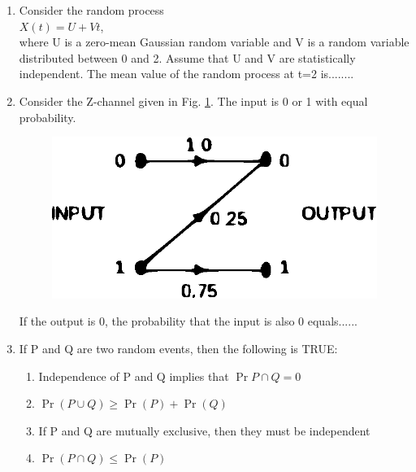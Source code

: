 \documentclass[journal,12pt,twocolumn]{IEEEtran}
\begin{document}
\begin{enumerate}
\begin{enumerate}
\end{enumerate}
%
\solution

\item Consider the random process\\
$ X(t) = U+Vt$,\\
where U is a zero-mean Gaussian random variable and V is a random variable distributed between 0 and 2. Assume that U and V are statistically independent. The mean value of the random  process at t=2 is........
%
\solution


\item Consider the Z-channel given in Fig. \ref{fig:1}. The input is 0 or 1 with equal probability.
\begin{figure}[!h]
\includegraphics[width=\columnwidth]{./figs/figure1.eps}
\caption{}
\label{fig:1}
\end{figure}



If the output is 0, the probability that the input is also 0 equals......

\item If P and Q are two random events, then the following is TRUE:

\begin{enumerate}

\item Independence of P and Q implies that $\Pr{P \cap Q} = 0$
\item $\Pr(P \cup Q)\geqslant \Pr(P)+\Pr(Q)$
\item If P and Q are mutually exclusive, then they must be independent
\item $\Pr(P \cap Q)\leqslant \Pr(P)$


\end{enumerate}
\end{enumerate}
\end{document}
